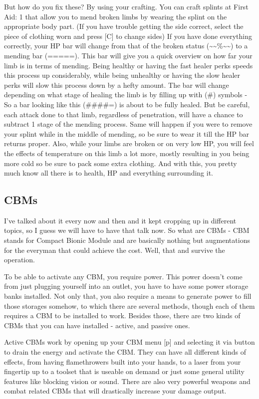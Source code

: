 \documentclass[11pt]{report}
\begin{document}
But how do you fix these? By using your crafting. You can craft splints at First Aid: 1 that allow you to mend broken limbs by wearing the splint on the appropriate body part. (If you have trouble getting the side correct, select the piece of clothing worn and press [C] to change sides) If you have done everything correctly, your HP bar will change from that of the broken status (\~{}\~{}\%\~{}\~{}) to a mending bar (=====). This bar will give you a quick overview on how far your limb is in terms of mending. Being healthy or having the fast healer perks speeds this process up considerably, while being unhealthy or having the slow healer perks will slow this process down by a hefty amount. The bar will change depending on what stage of healing the limb is by filling up with (\#) symbols - So a bar looking like this (\#\#\#\#=) is about to be fully healed. But be careful, each attack done to that limb, regardless of penetration, will have a chance to subtract 1 stage of the mending process. Same will happen if you were to remove your splint while in the middle of mending, so be sure to wear it till the HP bar returns proper. Also, while your limbs are broken or on very low HP, you will feel the effects of temperature on this limb a lot more, mostly resulting in you being more cold so be sure to pack some extra clothing. And with this, you pretty much know all there is to health, HP and everything surrounding it.

\subsection{CBMs}

I've talked about it every now and then and it kept cropping up in different topics, so I guess we will have to have that talk now. So what are CBMs - CBM stands for Compact Bionic Module and are basically nothing but augmentations for the everyman that could achieve the cost. Well, that and survive the operation.

To be able to activate any CBM, you require power. This power doesn't come from just plugging yourself into an outlet, you have to have some power storage banks installed. Not only that, you also require a means to generate power to fill those storages somehow, to which there are several methods, though each of them requires a CBM to be installed to work. Besides those, there are two kinds of CBMs that you can have installed - active, and passive ones.

Active CBMs work by opening up your CBM menu [p] and selecting it via button to drain the energy and activate the CBM. They can have all different kinds of effects, from having flamethrowers built into your hands, to a laser from your fingertip up to a toolset that is useable on demand or just some general utility features like blocking vision or sound. There are also very powerful weapons and combat related CBMs that will drastically increase your damage output.
\end{document}
